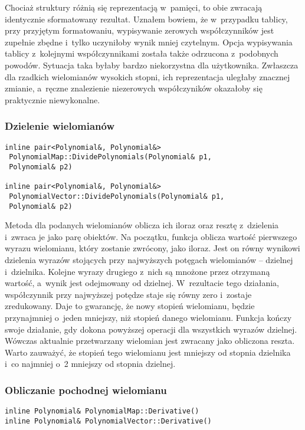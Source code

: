 Chociaż struktury różnią się reprezentacją w~pamięci, to obie zwracają identycznie sformatowany rezultat. Uznałem bowiem, że w~przypadku tablicy, przy przyjętym formatowaniu, wypisywanie zerowych współczynników jest zupełnie zbędne i~tylko uczyniłoby wynik mniej czytelnym. Opcja wypisywania tablicy z~kolejnymi współczynnikami została także odrzucona z~podobnych powodów. Sytuacja taka byłaby bardzo niekorzystna dla użytkownika. Zwłaszcza dla rzadkich wielomianów wysokich stopni, ich reprezentacja uległaby znacznej zmianie, a~ręczne znalezienie niezerowych współczyników okazałoby się praktycznie niewykonalne.

\subsubsection{Dzielenie wielomianów}
\begin{lstlisting}
inline pair<Polynomial&, Polynomial&>
 PolynomialMap::DividePolynomials(Polynomial& p1,
 Polynomial& p2)

inline pair<Polynomial&, Polynomial&>
 PolynomialVector::DividePolynomials(Polynomial& p1,
 Polynomial& p2)
\end{lstlisting}

Metoda dla podanych wielomianów oblicza ich iloraz oraz resztę z~dzielenia i~zwraca je jako parę obiektów. Na początku, funkcja oblicza wartość pierwszego wyrazu wielomianu, który zostanie zwrócony, jako iloraz. Jest on równy wynikowi dzielenia wyrazów stojących przy najwyższych potęgach wielomianów – dzielnej i~dzielnika. Kolejne wyrazy drugiego z~nich są mnożone przez otrzymaną wartość, a~wynik jest odejmowany od dzielnej. W~rezultacie tego działania, współczynnik przy najwyższej potędze staje się równy zero i~zostaje zredukowany. Daje to gwarancję, że nowy stopień wielomianu, będzie przynajmniej o~jeden mniejszy, niż stopień danego wielomianu. Funkcja kończy swoje działanie, gdy dokona powyższej operacji dla wszystkich wyrazów dzielnej. Wówczas aktualnie przetwarzany wielomian jest zwracany jako obliczona reszta. Warto zauważyć, że stopień tego wielomianu jest mniejszy od stopnia dzielnika i~co najmniej o~2 mniejszy od stopnia dzielnej.

\subsubsection{Obliczanie pochodnej wielomianu}
\begin{lstlisting}
inline Polynomial& PolynomialMap::Derivative()
inline Polynomial& PolynomialVector::Derivative()
\end{lstlisting}

